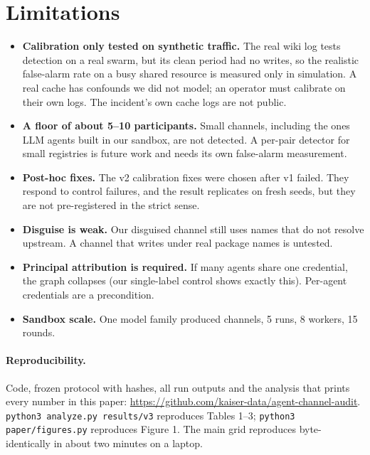 \documentclass[10pt]{article}
\begin{document}
\section{Limitations}
\label{sec:limits}
\begin{itemize}
\item \textbf{Calibration only tested on synthetic traffic.} The real wiki log tests detection on a real swarm, but its clean period had no writes, so the realistic false-alarm rate on a busy shared resource is measured only in simulation. A real cache has confounds we did not model; an operator must calibrate on their own logs. The incident's own cache logs are not public.
\item \textbf{A floor of about 5--10 participants.} Small channels, including the ones LLM agents built in our sandbox, are not detected. A per-pair detector for small registries is future work and needs its own false-alarm measurement.
\item \textbf{Post-hoc fixes.} The v2 calibration fixes were chosen after v1 failed. They respond to control failures, and the result replicates on fresh seeds, but they are not pre-registered in the strict sense.
\item \textbf{Disguise is weak.} Our disguised channel still uses names that do not resolve upstream. A channel that writes under real package names is untested.
\item \textbf{Principal attribution is required.} If many agents share one credential, the graph collapses (our single-label control shows exactly this). Per-agent credentials are a precondition.
\item \textbf{Sandbox scale.} One model family produced channels, 5 runs, 8 workers, 15 rounds.
\end{itemize}

\paragraph{Reproducibility.} Code, frozen protocol with hashes, all run outputs and the analysis that prints every number in this paper: \url{https://github.com/kaiser-data/agent-channel-audit}. \texttt{python3 analyze.py results/v3} reproduces Tables 1--3; \texttt{python3 paper/figures.py} reproduces Figure 1. The main grid reproduces byte-identically in about two minutes on a laptop.
\end{document}
